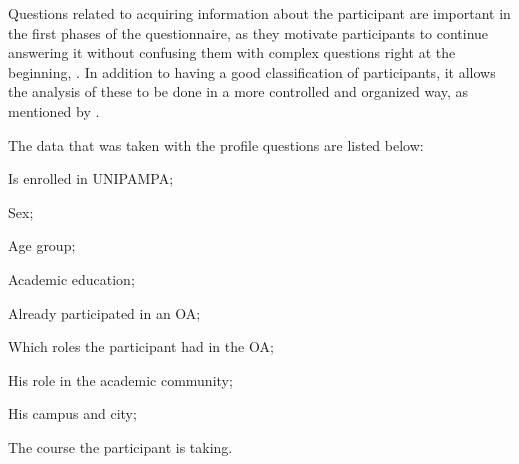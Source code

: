 Questions related to acquiring information about the participant are important in the first phases of the questionnaire, as they motivate participants to continue answering it without confusing them with complex questions right at the beginning, \cite{LMRea}.
In addition to having a good classification of participants, it allows the analysis of these to be done in a more controlled and organized way, as mentioned by \textcite{legramante}.


The data that was taken with the profile questions are listed below:
\begin{inparaenum}[(1)]
  \item Is enrolled in \ac{UNIPAMPA};
  \item Sex;
  \item Age group;
  \item Academic education;
  \item Already participated in an \ac{OA};
  \item Which roles the participant had in the \ac{OA};
  \item His role in the academic community;
  \item His campus and city;
  \item The course the participant is taking.
\end{inparaenum}

